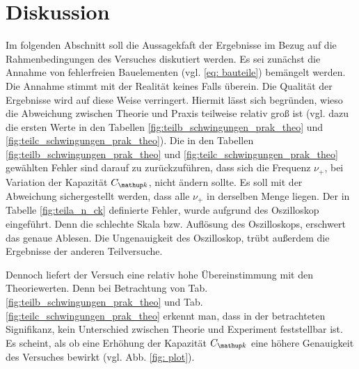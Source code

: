 \section{Diskussion}
Im folgenden Abschnitt soll die Aussagekfaft der Ergebnisse im Bezug auf 
die Rahmenbedingungen des Versuches diskutiert werden.
Es sei zunächst die Annahme von fehlerfreien Bauelementen (vgl. \eqref{eq: bauteile}) 
bemängelt werden. Die Annahme stimmt mit der Realität keines Falls überein.
Die Qualität der Ergebnisse wird auf diese Weise verringert.
Hiermit lässt sich begründen, wieso die Abweichung zwischen Theorie und Praxis teilweise
relativ groß ist (vgl. dazu die ersten Werte in den Tabellen \ref{fig:teilb_schwingungen_prak_theo} und \ref{fig:teilc_schwingungen_prak_theo}).
Die in den Tabellen \ref{fig:teilb_schwingungen_prak_theo} und \ref{fig:teilc_schwingungen_prak_theo} gewählten Fehler sind darauf zu 
zurückzuführen, dass sich die Frequenz $\nu_+$, bei Variation der Kapazität $C\ua{k}$, nicht ändern sollte.
Es soll mit der Abweichung sichergestellt werden, dass alle $\nu_+$ in derselben Menge liegen.
Der in Tabelle \ref{fig:teila_n_ck} definierte Fehler, wurde aufgrund des  Oszilloskop eingeführt.
Denn die schlechte Skala bzw. Auflösung des Oszilloskops, erschwert das genaue Ablesen. 
Die Ungenauigkeit des Oszilloskop, trübt außerdem  die Ergebnisse der anderen Teilversuche.

Dennoch liefert der Versuch eine relativ hohe Übereinstimmung mit den Theoriewerten.
Denn bei Betrachtung von Tab. \ref{fig:teilb_schwingungen_prak_theo} und Tab. \ref{fig:teilc_schwingungen_prak_theo} erkennt man, 
dass in der betrachteten Signifikanz, kein Unterschied zwischen 
Theorie und Experiment feststellbar ist. 
Es scheint, als ob eine Erhöhung der Kapazität $C\ua{k}$ eine höhere Genauigkeit des Versuches bewirkt (vgl. Abb. \ref{fig: plot}).


